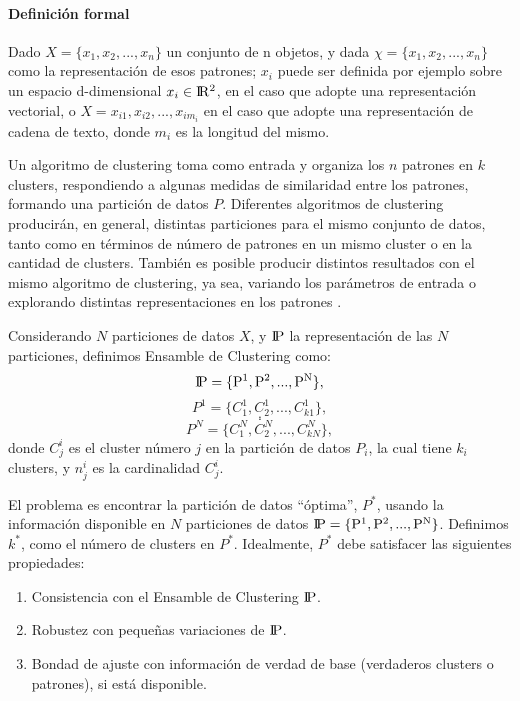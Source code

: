 \paragraph{Definición formal}
Dado \(X = \{x_1, x_2,... , x_n\}\) un conjunto de n objetos, y dada \(\chi = \{x_1, x_2,... , x_n\}\) como la representación de esos patrones; \(x_i\) puede ser definida por ejemplo sobre un espacio d-dimensional \(x_i \in \rm I\!R^2\), en el caso que adopte una representación vectorial, o \(X = x_{i1}, x_{i2},... , x_{im_i}\) en el caso que adopte una representación de cadena de texto, donde \(m_i\) es la longitud del mismo.

\bigskip Un algoritmo de clustering toma  como entrada y organiza los \(n\) patrones en \(k\) clusters, respondiendo a algunas medidas de similaridad entre los patrones, formando una partición de datos \(P\). Diferentes algoritmos de clustering producirán, en general, distintas particiones para el mismo conjunto de datos, tanto como en términos de número de patrones en un mismo cluster o en la cantidad de clusters. También es posible producir distintos resultados con el mismo algoritmo de clustering, ya sea, variando los parámetros de entrada o explorando distintas representaciones en los patrones \citep{fred2005combining}.

\bigskip Considerando \(N\) particiones de datos \(X\), y \(\rm I\!P\) la representación de las \(N\) particiones, definimos Ensamble de Clustering como:
\[\rm I\!P = \{P^1, P^2, ..., P^N\},\]
\[P^1 = \{C^1_1, C^1_2, ..., C^1_{k1}\},\]
\[.\]
\[.\]
\[P^N = \{C^N_1, C^N_2, ..., C^N_{kN}\},\]
donde \(C^i_j\) es el cluster número \(j\) en la partición de datos \(P_i\), la cual tiene \(k_i\) clusters, y \(n^i_j\) es la cardinalidad \(C^i_j\).

\bigskip El problema es encontrar la partición de datos “óptima”, \(P^*\), usando la información disponible en \(N\) particiones de datos \(\rm I\!P = \{P^1, P^2, ..., P^N\}\). Definimos \(k^*\), como el número de clusters en \(P^*\). Idealmente, \(P^*\) debe satisfacer las siguientes propiedades:

\begin{enumerate}
	\item Consistencia con el Ensamble de Clustering \(\rm I\!P\).
	\item Robustez con pequeñas variaciones de \(\rm I\!P\).
	\item Bondad de ajuste con información de verdad de base (verdaderos clusters o patrones), si está disponible.
\end{enumerate}

